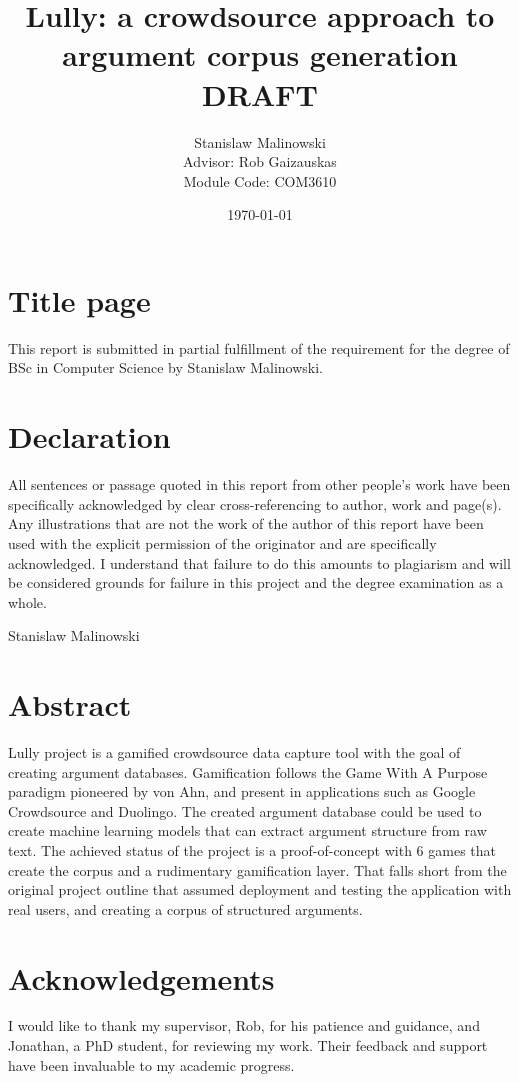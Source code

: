 \documentclass{report}
\title{Lully: a crowdsource approach to argument corpus generation DRAFT}
\author{Stanislaw Malinowski
\\[1cm]{\small Advisor: Rob Gaizauskas}
\\[1cm]{\small Module Code: COM3610}
}
\date{\today}
\begin{document}
\maketitle
\section*{Title page}
This report is submitted in partial fulfillment of the requirement for the degree of BSc in Computer Science by Stanislaw Malinowski.
\newpage

\section*{Declaration}
All sentences or passage quoted in this report from other people's work have been specifically acknowledged by clear cross-referencing to author, work and page(s). Any illustrations that are not the work of the author of this report have been used with the explicit permission of the originator and are specifically acknowledged. I understand that failure to do this amounts to plagiarism and will be considered grounds for failure in this project and the degree examination as a whole.

Stanislaw Malinowski
\newpage

\section*{Abstract}

Lully project is a gamified crowdsource data capture tool with the goal of creating argument databases. Gamification follows the Game With A Purpose paradigm pioneered by von Ahn, and present in applications such as Google Crowdsource and Duolingo. The created argument database could be used to create machine learning models that can extract argument structure from raw text.
The achieved status of the project is a proof-of-concept with 6 games that create the corpus and a rudimentary gamification layer. That falls short from the original project outline that assumed deployment and testing the application with real users, and creating a corpus of structured arguments. 

\newpage

\section*{Acknowledgements}
I would like to thank my supervisor, Rob, for his patience and guidance, and Jonathan, a PhD student, for reviewing my work. Their feedback and support have been invaluable to my academic progress.
\end{document}
